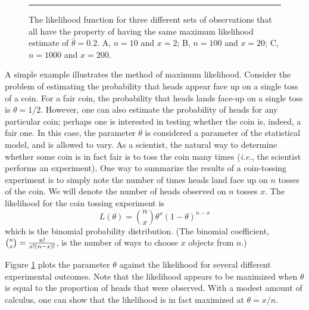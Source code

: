 \documentclass{article}
\begin{document}
\begin{figure}[t]
\begin{center}
\end{center}
\caption{The likelihood function for three different sets of observations that all have the property of having the same
maximum likelihood estimate of $\hat{\theta} = 0.2$.
A, $n=10$ and $x=2$; B, $n=100$ and $x = 20$; C, $n=1000$ and $x = 200$.}
\label{coin_eg}
\medskip
\hrule
\end{figure}

A simple example illustrates the method of maximum likelihood. Consider the problem of estimating the probability that
heads appear face up on a single toss of a coin. For a fair coin, the probability that heads lands face-up on a single toss is $\theta = 1/2$.
However, one can also estimate the probability of heads for any particular coin; perhaps one is interested in testing whether 
the coin is, indeed, a fair one. In this case, the parameter $\theta$ is considered a parameter of the statistical model, and is
allowed to vary. As a scientist, the natural way to determine whether some coin is in fact fair is to toss the coin many times ({\it i.e.}, 
the scientist performs an experiment). One way to summarize the results of a coin-tossing experiment is to simply note the number of
times heads land face up on $n$ tosses of the coin. We will denote the number of heads observed on $n$ tosses $x$. The likelihood for the coin
tossing experiment is 
$$
L(\theta) = {n \choose x} \theta^x (1-\theta)^{n-x}
$$
which is the binomial probability distribution. (The binomial coefficient, ${n \choose x} = {n! \over x!(n-x)!}$, is the number of
ways to choose $x$ objects from $n$.)

Figure \ref{coin_eg} plots the parameter $\theta$ against the likelihood for several different experimental outcomes. Note that the likelihood appears
to be maximized when $\theta$ is equal to the proportion of heads that were observed. With a modest amount of
calculus, one can show that the likelihood is in fact maximized at $\theta = x/n$. 
\end{document}
